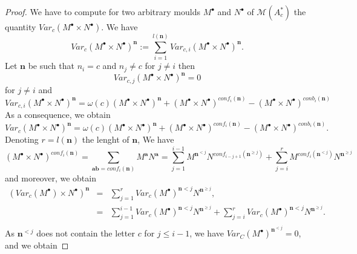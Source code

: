 \documentclass[english,11pt]{amsart}
\def\nn{\mathbf{n}}
\def\aa{\mathbf{a}}
\def\bb{\mathbf{b}}
\def\M{\mathscr{M}}
\def\di{\displaystyle}
\def\nn{\mathbf{n}}
\begin{document}
\begin{proof}
    We have to compute for two arbitrary moulds $M^{\bullet}$ and $N^{\bullet}$ of $\M (A_c^* )$ the quantity $Var_c (M^{\bullet} \times N^{\bullet} )$. We have 
    \begin{equation}
        Var_c (M^{\bullet} \times N^{\bullet})^{\nn} :=\di\sum_{i=1}^{l(\nn )} Var_{c,i} (M^{\bullet} \times N^{\bullet})^{\nn} .
    \end{equation}
Let $\nn$ be such that $n_i =c$ and $n_j\not =c$ for $j\not= i$ then
    \begin{equation}
        Var_{c,j} (M^{\bullet} \times N^{\bullet})^{\nn} =0 
    \end{equation}
    for $j\not=i$ and
    \begin{equation}
        Var_{c,i} (M^{\bullet} \times N^{\bullet})^{\nn} =\omega (c) (M^{\bullet} \times N^{\bullet} )^{\nn} + (M^{\bullet} \times N^{\bullet} )^{conf_i (\nn )} -(M^{\bullet} \times N^{\bullet} )^{conb_i (\nn )}
    \end{equation}
    As a consequence, we obtain
    \begin{equation}
    \label{var0}
        Var_c (M^{\bullet} \times N^{\bullet})^{\nn} =\omega (c) (M^{\bullet} \times N^{\bullet} )^{\nn} + (M^{\bullet} \times N^{\bullet} )^{conf_i (\nn )} -(M^{\bullet} \times N^{\bullet} )^{conb_i (\nn )} .
    \end{equation}
Denoting $r=l (\nn )$ the lenght of $\nn$, We have    
\begin{equation}
    (M^{\bullet} \times N^{\bullet} )^{conf_i (\nn )} =\di\sum_{\aa \bb = conf_i (\nn ) } M^{\aa} N^{\aa} =\sum_{j=1}^{i-1} M^{\nn^{<j}} N^{conf_{i-j+1} (\nn^{\geq j} )} +
    \sum_{j=i}^{r} M^{conf_i (\nn^{<j})} N^{\nn^{\geq j}}
\end{equation}
and moreover, we obtain 
\begin{equation}
\left .
\begin{array}{lll}
\left (     Var_c (M^{\bullet})\times N^{\bullet} \right ) ^{\nn} & = & 
\di\sum_{j=1}^r \di Var_c (M^{\bullet})^{\nn <j} N^{\nn^{\geq j}} ,\\
 & = & \di\sum_{j=1}^{i-1} Var_c (M^{\bullet})^{\nn <j} N^{\nn^{\geq j}} 
 + \di\sum_{j=i}^{r} Var_c (M^{\bullet})^{\nn <j} N^{\nn^{\geq j}} .\\
\end{array}
\right .
\end{equation}
As $\nn^{<j}$ does not contain the letter $c$ for $j\leq i-1$, we have $Var_C (M^{\bullet})^{\nn^{<j}} =0$, and we obtain

\end{proof}
\end{document}
